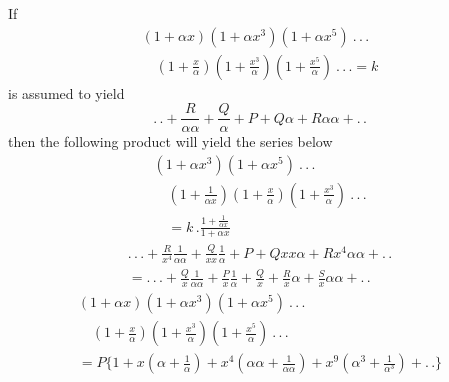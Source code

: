 \noindent If
\[
\begin{gathered}(1+\alpha x)(1+\alpha x^{3})(1+\alpha x^{5})\ .\,.\,.
\\[7pt]\quad{}(1+\tfrac{x}{\alpha})(1+\tfrac{x^{3}}{\alpha})(1+\tfrac{x^{5}}{\alpha})\ .\,.\,.=k\end{gathered}
\]
\noindent is assumed to yield
\[
.\,.+\frac{R}{\alpha\alpha}+\frac{Q}{\alpha}+P+Q\alpha+R\alpha\alpha+ .\,.
\]
\noindent then the following product will yield the series below
\[
\begin{gathered}(1+\alpha x^{3})(1+\alpha x^{5})\ .\,.\,.
\\[7pt]\quad{}(1+\tfrac1{\alpha x})(1+\tfrac{x}{\alpha})(1+\tfrac{x^{3}}{\alpha})\ .\,.\,.
\\[7pt]\quad{}=k\,.\frac{1+\frac1{\alpha x}}{1+\alpha x}\end{gathered}
\]
\[
\begin{gathered}
.\,.\,.+\frac{R}{x^{4}}\frac1{\alpha\alpha}
+\frac{Q}{xx}\frac1\alpha+P+Qxx\alpha+Rx^{4}\alpha\alpha+ .\,.
\\[7pt]
=.\,.\,.+\frac{Q}{x}\frac1{\alpha\alpha}+\frac{P}{x}\frac1\alpha
+\frac{Q}{x}+\frac{R}{x}\alpha+\frac{S}{x}\alpha\alpha+ .\,.
\end{gathered}
\]
\[
\begin{gathered}
(1+\alpha x)(1+\alpha x^{3})(1+\alpha x^{5})\ .\,.\,.
\\[7pt]\quad{}(1+\tfrac{x}{\alpha})(1+\tfrac{x^{3}}{\alpha})(1+\tfrac{x^{5}}{\alpha})\ .\,.\,.
\\[7pt]
=P\{1+x(\alpha+\tfrac1\alpha)
+x^{4}(\alpha\alpha+\tfrac1{\alpha\alpha})
+x^{9}(\alpha^{3}+\tfrac1{\alpha^{3}})+ .\,.\}
\end{gathered}
\]

